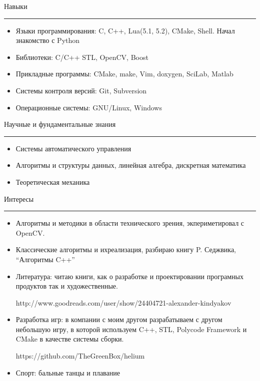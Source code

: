 \documentclass{article}
\begin{document}
\rule{0pt}{1cm}
{\large{Навыки}}
\hrule \smallskip
\begin{itemize}
    \item Языки программирования:   C, C++, Lua(5.1, 5.2), CMake, Shell. Начал знакомство с Python
    \item Библиотеки:               C/C++ STL, OpenCV, Boost
    \item Прикладные программы:     CMake, make, Vim, doxygen, SciLab, Matlab
    \item Системы контроля версий:  Git, Subversion
    \item Операционные системы:     GNU/Linux, Windows
\end{itemize}

\rule{0pt}{1cm}
{\large{Научные и фундаментальные знания}}
\hrule \smallskip
\begin{itemize}
    \item Системы автоматического управления
    \item Алгоритмы и структуры данных, линейная алгебра, дискретная математика
    \item Теоретическая механика
\end{itemize}

\rule{0pt}{1cm}
{\large{Интересы}}
\hrule \smallskip
\begin{itemize}
    \item Алгоритмы и методики в области технического зрения, экпериметировал с OpenCV.
    \item Классические алгоритмы и ихреализация, разбираю книгу P. Седжвика, ``Алгоритмы C++''
    \item Литература: читаю книги, как о разработке и проектировании програмных
продуктов так и художественные. 

http://www.goodreads.com/user/show/24404721-alexander-kindyakov    
    \item Разработка игр: в компании с моим другом разрабатываем с другом небольшую игру, в которой
используем C++, STL, Polycode Framework и CMake в качестве системы сборки.
 
https://github.com/TheGreenBox/helium 
    \item Спорт: бальные танцы и плавание
\end{itemize}
\end{document}
